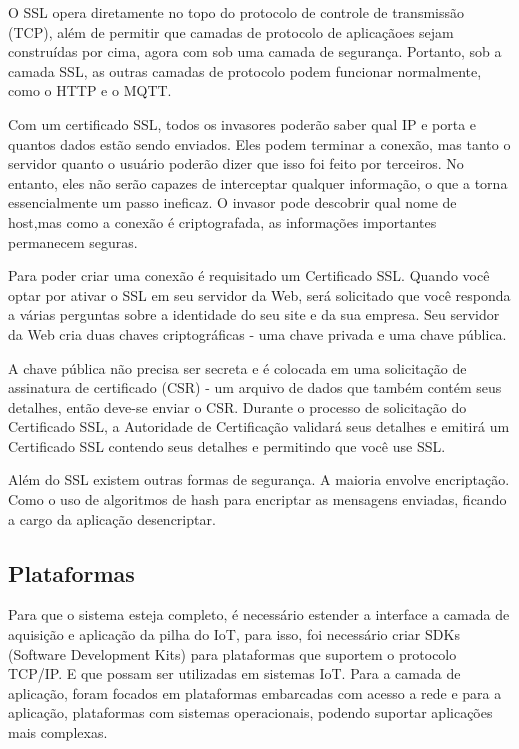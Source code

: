 O SSL opera diretamente no topo do protocolo de controle de transmissão (TCP), além de permitir que camadas de protocolo de aplicaçãoes sejam construídas por cima, agora com sob uma camada de segurança. Portanto, sob a camada SSL, as outras camadas de protocolo podem funcionar normalmente, como o HTTP e o MQTT.

Com um certificado SSL, todos os invasores poderão saber qual IP e porta e quantos dados estão sendo enviados. Eles podem terminar a conexão, mas tanto o servidor quanto o usuário poderão dizer que isso foi feito por terceiros. No entanto, eles não serão capazes de interceptar qualquer informação, o que a torna essencialmente um passo ineficaz. O invasor pode descobrir qual nome de host,mas como a conexão é criptografada, as informações importantes permanecem seguras.

Para poder criar uma conexão é requisitado um Certificado SSL. Quando você optar por ativar o SSL em seu servidor da Web, será solicitado que você responda a várias perguntas sobre a identidade do seu site e da sua empresa. Seu servidor da Web cria duas chaves criptográficas - uma chave privada e uma chave pública.

A chave pública não precisa ser secreta e é colocada em uma solicitação de assinatura de certificado (CSR) - um arquivo de dados que também contém seus detalhes, então deve-se enviar o CSR. Durante o processo de solicitação do Certificado SSL, a Autoridade de Certificação validará seus detalhes e emitirá um Certificado SSL contendo seus detalhes e permitindo que você use SSL.

Além do SSL existem outras formas de segurança. A maioria envolve encriptação. Como o uso de algoritmos de hash para encriptar as mensagens enviadas, ficando a cargo da aplicação desencriptar.

\subsection{Plataformas}
\label{subsection:plataformas}

Para que o sistema esteja completo, é necessário estender a interface a camada de aquisição e aplicação da pilha do IoT, para isso, foi necessário criar SDKs (Software Development Kits) para plataformas que suportem o protocolo TCP/IP. E que possam ser utilizadas em sistemas IoT. Para a camada de aplicação, foram focados em plataformas embarcadas com acesso a rede e para a aplicação, plataformas com sistemas operacionais, podendo suportar aplicações mais complexas.

